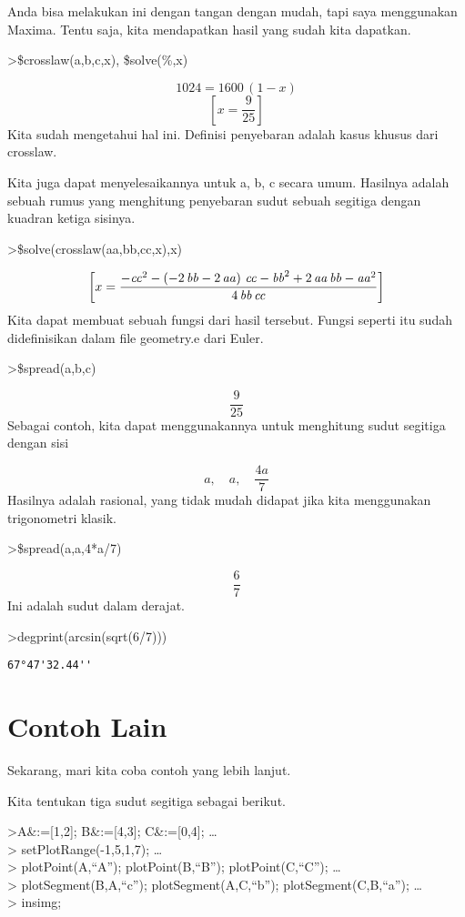 \documentclass[
]{book}
\begin{document}
Anda bisa melakukan ini dengan tangan dengan mudah, tapi saya menggunakan Maxima. Tentu saja, kita mendapatkan hasil yang sudah kita dapatkan.

\textgreater\$crosslaw(a,b,c,x), \$solve(\%,x)

\[1024=1600\,\left(1-x\right)\]\[\left[ x=\frac{9}{25} \right] \]Kita sudah mengetahui hal ini. Definisi penyebaran adalah kasus khusus dari crosslaw.

Kita juga dapat menyelesaikannya untuk a, b, c secara umum. Hasilnya adalah sebuah rumus yang menghitung penyebaran sudut sebuah segitiga dengan kuadran ketiga sisinya.

\textgreater\$solve(crosslaw(aa,bb,cc,x),x)

\[\left[ x=\frac{-{\it cc}^2-\left(-2\,{\it bb}-2\,{\it aa}\right)\,
 {\it cc}-{\it bb}^2+2\,{\it aa}\,{\it bb}-{\it aa}^2}{4\,{\it bb}\,
 {\it cc}} \right] \]Kita dapat membuat sebuah fungsi dari hasil tersebut. Fungsi seperti itu sudah didefinisikan dalam file geometry.e dari Euler.

\textgreater\$spread(a,b,c)

\[\frac{9}{25}\]Sebagai contoh, kita dapat menggunakannya untuk menghitung sudut segitiga dengan sisi

\[a, \quad a, \quad \frac{4a}{7}\]Hasilnya adalah rasional, yang tidak mudah didapat jika kita menggunakan trigonometri klasik.

\textgreater\$spread(a,a,4*a/7)

\[\frac{6}{7}\]Ini adalah sudut dalam derajat.

\textgreater degprint(arcsin(sqrt(6/7)))

\begin{verbatim}
67°47'32.44''
\end{verbatim}

\section{Contoh Lain}\label{contoh-lain}

Sekarang, mari kita coba contoh yang lebih lanjut.

Kita tentukan tiga sudut segitiga sebagai berikut.

\textgreater A\&:={[}1,2{]}; B\&:={[}4,3{]}; C\&:={[}0,4{]}; \ldots{}\\
\textgreater{} setPlotRange(-1,5,1,7); \ldots{}\\
\textgreater{} plotPoint(A,``A''); plotPoint(B,``B''); plotPoint(C,``C''); \ldots{}\\
\textgreater{} plotSegment(B,A,``c''); plotSegment(A,C,``b''); plotSegment(C,B,``a''); \ldots{}\\
\textgreater{} insimg;
\end{document}
